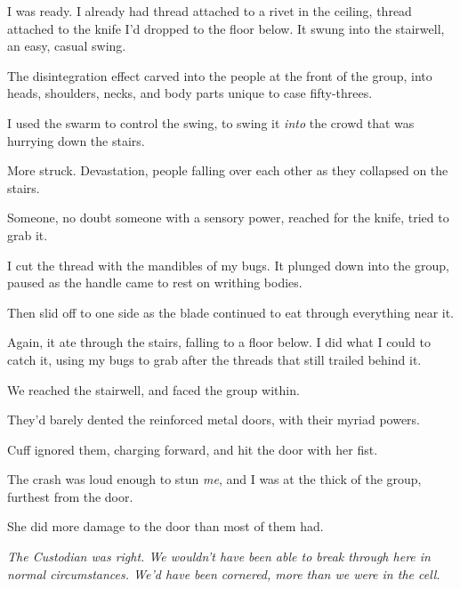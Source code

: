 I was ready.  I already had thread attached to a rivet in the ceiling, thread attached to the knife I'd dropped to the floor below.  It swung into the stairwell, an easy, casual swing.



The disintegration effect carved into the people at the front of the group, into heads, shoulders, necks, and body parts unique to case fifty-threes.



I used the swarm to control the swing, to swing it \emph{into} the crowd that was hurrying down the stairs.



More struck.  Devastation, people falling over each other as they collapsed on the stairs.



Someone, no doubt someone with a sensory power, reached for the knife, tried to grab it.



I cut the thread with the mandibles of my bugs.  It plunged down into the group, paused as the handle came to rest on writhing bodies.



Then slid off to one side as the blade continued to eat through everything near it.



Again, it ate through the stairs, falling to a floor below.  I did what I could to catch it, using my bugs to grab after the threads that still trailed behind it.



We reached the stairwell, and faced the group within.



They'd barely dented the reinforced metal doors, with their myriad powers.



Cuff ignored them, charging forward, and hit the door with her fist.



The crash was loud enough to stun \emph{me}, and I was at the thick of the group, furthest from the door.



She did more damage to the door than most of them had.



\emph{The Custodian was right.  We wouldn't have been able to break through here in normal circumstances.  We'd have been cornered, more than we were in the cell}.



